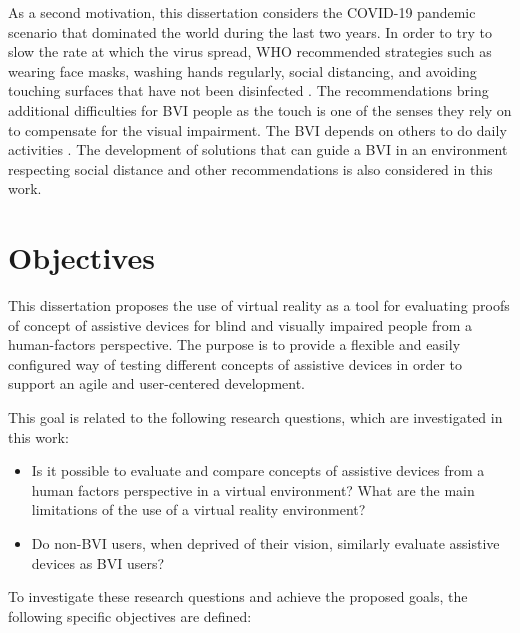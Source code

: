 As a second motivation, this dissertation considers the COVID-19 pandemic scenario that dominated the world during the last two years. In order to try to slow the rate at which the virus spread, WHO recommended strategies such as wearing face masks, washing hands regularly, social distancing, and avoiding touching surfaces that have not been disinfected \cite{who_2020}. The recommendations bring additional difficulties for BVI people as the touch is one of the senses they rely on to compensate for the visual impairment. The BVI depends on others to do daily activities \cite{jondani2021strategies}. The development of solutions that can guide a BVI in an environment respecting social distance and other recommendations is also considered in this work.

\section{Objectives}
\label{sec:objetivos}

 This dissertation proposes the use of virtual reality as a tool for evaluating proofs of concept of assistive devices for blind and visually impaired people from a human-factors perspective. The purpose is to provide a flexible and easily configured way of testing different concepts of assistive devices in order to support an agile and user-centered development.

 This goal is related to the following research questions, which are investigated in this work:

 \begin{itemize}
    \item Is it possible to evaluate and compare concepts of assistive devices from a human factors perspective in a virtual environment? What are the main limitations of the use of a virtual reality environment? \label{itm:obj_first}
    \item Do non-BVI users, when deprived of their vision, similarly evaluate assistive devices as BVI users? \label{itm:obj_second}
\end{itemize}
  
 To investigate these research questions and achieve the proposed goals, the following specific objectives are defined:
 
